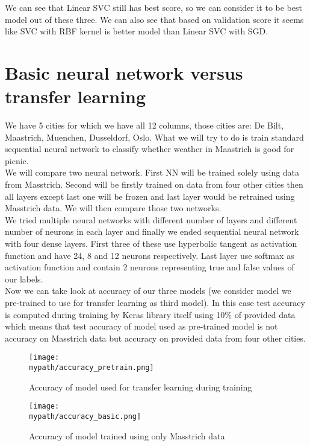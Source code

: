 \documentclass[a4paper]{article}
\begin{document}
	We can see that Linear SVC still has best score, so we can consider it to be best model out of these three. We can also see that based on validation score it seems like SVC with RBF kernel is better model than Linear SVC with SGD. 
	
	\newpage

	\section{Basic neural network versus transfer learning}
	
	We have 5 cities for which we have all 12 columns, those cities are: De Bilt, Maastrich, Muenchen, Dusseldorf, Oslo. What we will try to do is train standard sequential neural network to classify whether weather in Maastrich is good for picnic. 
	\\
	
	We will compare two neural network. First NN will be trained solely using data from Masstrich. Second will be firstly trained on data from four other cities then all layers except last one will be frozen and last layer would be retrained using Masstrich data. We will then compare those two networks.  
	\\
	
	We tried multiple neural networks with different number of layers and different number of neurons in each layer and finally we ended sequential neural network with four dense layers. First three of these use hyperbolic tangent as activation function and have 24, 8 and 12 neurons respectively. Last layer use softmax as activation function and contain 2 neurons representing true and false values of our labels.    
	\\
	
	Now we can take look at accuracy of our three models (we consider model we pre-trained to use for transfer learning as third model). In this case test accuracy is computed during training by Keras library itself using 10\% of provided data which means that test accuracy of model used as pre-trained model is not accuracy on Masstrich data but accuracy on provided data from four other cities.
	
	
	\begin{figure}[h!]
		\centerline{\texttt{[image: \\mypath/accuracy\_pretrain.png]}}
		\caption{Accuracy of model used for transfer learning during training}
	\end{figure}

	\begin{figure}[h!]
		\centerline{\texttt{[image: \\mypath/accuracy\_basic.png]}}
		\caption{Accuracy of model trained using only Masstrich data}
	\end{figure}
\end{document}
